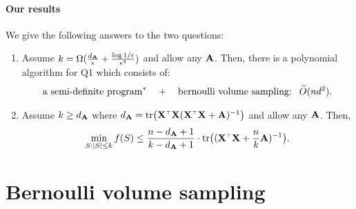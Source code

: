 \documentclass[12pt]{sty/colt2019/colt2018-arxiv}
\begin{document}
\paragraph{Our results} We give the following answers to the two
questions:
\begin{enumerate}
\item Assume $k=\Omega(\frac {d_{\mathbf A}}\epsilon +
    \frac{\log1/\epsilon}{\epsilon^2})$ and allow any $\mathbf A$. Then,
    there is a polynomial algorithm for Q1 which consists of:
    \begin{align*}
\text{a semi-definite program}^*\quad+\quad \text{bernoulli volume
      sampling: }\ \widetilde{O}(nd^2).
    \end{align*}
  \item Assume $k\geq d_{\mathbf A}$ where $d_{\A}=\tr\big(\X^\top\X(\X^\top\X+\A)^{-1}\big)$ and allow any $\mathbf A$. Then,
    \begin{align*}
      \min_{S:|S|\leq k}f(S)\leq \frac{n-d_{\A}+1}{k-d_{\A}+1}\cdot
      \tr\big((\X^\top\X+\frac nk \A)^{-1}\big).      
    \end{align*}
    
\end{enumerate}

\section{Bernoulli volume sampling}
\end{document}
